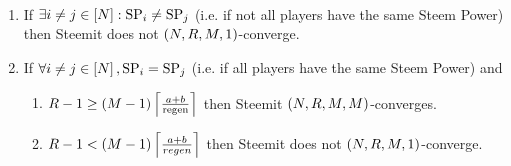 \begin{theorem}
  \label{theorem:convergence:steem} \
  \begin{enumerate}
    \item \label{theorem:case:varstpow} If $\exists i \neq j \in
    \left[\playerlen\right]: \stpow_i \neq \stpow_j$ (i.e. if not all players
    have the same Steem Power) then Steemit does not $\left(\playerlen, \rounds,
    \postlen, 1\right)$-converge.
    \item If $\forall i \neq j \in \left[\playerlen\right], \stpow_i = \stpow_j$
    (i.e. if all players have the same Steem Power) and
    \begin{enumerate}
      \item \label{theorem:case:manyrounds} $\rounds - 1 \geq \left(\postlen -
      1\right) \ceil*{\frac{a+b}{\regen}}$ then Steemit $\left(\playerlen,
      \rounds, \postlen, \postlen\right)$-converges.
      \item \label{theorem:case:fewrounds} $\rounds - 1 < \left(\postlen -
      1\right) \ceil*{\frac{a+b}{regen}}$ then Steemit does not
      $\left(\playerlen, \rounds,\postlen, 1\right)$-converge.
    \end{enumerate}
  \end{enumerate}
\end{theorem}
